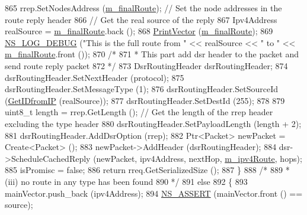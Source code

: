 \begin{DoxyCode}
865               rrep.SetNodesAddress (\hyperlink{classns3_1_1dsr_1_1DsrOptions_a3fe6a72ebaae73724ce63383635b7af8}{m\_finalRoute});     \textcolor{comment}{// Set the node addresses in the route
       reply header}
866               \textcolor{comment}{// Get the real source of the reply}
867               Ipv4Address realSource = \hyperlink{classns3_1_1dsr_1_1DsrOptions_a3fe6a72ebaae73724ce63383635b7af8}{m\_finalRoute}.back ();
868               \hyperlink{classns3_1_1dsr_1_1DsrOptions_a44ae8e58769880ec9c0150bb28652350}{PrintVector} (\hyperlink{classns3_1_1dsr_1_1DsrOptions_a3fe6a72ebaae73724ce63383635b7af8}{m\_finalRoute});
869               \hyperlink{group__logging_ga413f1886406d49f59a6a0a89b77b4d0a}{NS\_LOG\_DEBUG} (\textcolor{stringliteral}{"This is the full route from "} << realSource << \textcolor{stringliteral}{" to "} << 
      \hyperlink{classns3_1_1dsr_1_1DsrOptions_a3fe6a72ebaae73724ce63383635b7af8}{m\_finalRoute}.front ());
870               \textcolor{comment}{/*}
871 \textcolor{comment}{               * This part add dsr header to the packet and send route reply packet}
872 \textcolor{comment}{               */}
873               DsrRoutingHeader dsrRoutingHeader;
874               dsrRoutingHeader.SetNextHeader (protocol);
875               dsrRoutingHeader.SetMessageType (1);
876               dsrRoutingHeader.SetSourceId (\hyperlink{classns3_1_1dsr_1_1DsrOptions_a7e53a9a0421c607e17866e7dd0dd5440}{GetIDfromIP} (realSource));
877               dsrRoutingHeader.SetDestId (255);
878 
879               uint8\_t length = rrep.GetLength ();  \textcolor{comment}{// Get the length of the rrep header excluding the type
       header}
880               dsrRoutingHeader.SetPayloadLength (length + 2);
881               dsrRoutingHeader.AddDsrOption (rrep);
882               Ptr<Packet> newPacket = Create<Packet> ();
883               newPacket->AddHeader (dsrRoutingHeader);
884               dsr->ScheduleCachedReply (newPacket, ipv4Address, nextHop, 
      \hyperlink{classns3_1_1dsr_1_1DsrOptions_ae4785209eae1d101cb8bd2d3b392d2ad}{m\_ipv4Route}, hops);
885               isPromisc = \textcolor{keyword}{false};
886           \textcolor{keywordflow}{return} rreq.GetSerializedSize ();
887         \}
888       \textcolor{comment}{/*}
889 \textcolor{comment}{       * (iii) no route in any type has been found}
890 \textcolor{comment}{       */}
891       \textcolor{keywordflow}{else}
892         \{
893           mainVector.push\_back (ipv4Address);
894           \hyperlink{assert_8h_a6dccdb0de9b252f60088ce281c49d052}{NS\_ASSERT} (mainVector.front () == source);

\end{DoxyCode}
